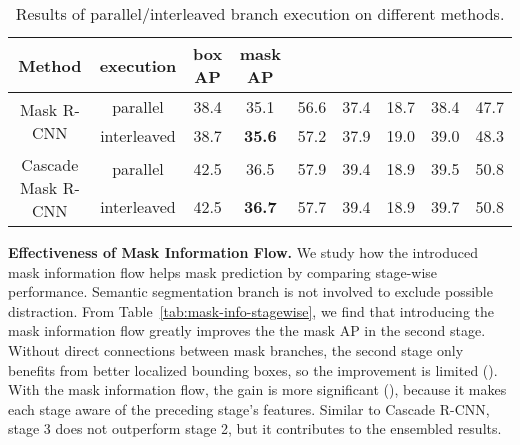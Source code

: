 \documentclass[10pt,twocolumn,letterpaper]{article}
\begin{document}
\begin{table*}[htb]
	\centering
	\caption{Results of parallel/interleaved branch execution on different methods.}
	\begin{tabular}{*{9}{c}}
		\toprule
		Method                              & execution   & box AP & mask AP &  &  &  &  &  \\
		\midrule
		\multirow{2}{*}{Mask R-CNN}         & parallel    &   38.4   &  35.1  &  56.6   &       37.4       &     18.7         &    38.4         &       47.7                      \\
		                                    & interleaved &   38.7 &   \textbf{35.6}  &     57.2         &       37.9        &    19.0        &      39.0       &      48.3       \\
		\midrule
		\multirow{2}{*}{Cascade Mask R-CNN} & parallel    &  42.5  &  36.5   &       57.9       &    39.4          &     18.9        &     39.5       &     50.8    \\
		                                    & interleaved &  42.5  &  \textbf{36.7}   &       57.7       &    39.4          &      18.9      &      39.7       &       50.8      \\
		\bottomrule
	\end{tabular}
	\label{tab:interleaved}
\end{table*}

\noindent\textbf{Effectiveness of Mask Information Flow.}
We study how the introduced mask information flow helps mask prediction by
comparing stage-wise performance.
Semantic segmentation branch is not involved to exclude possible distraction.
From Table~\ref{tab:mask-info-stagewise}, we find that introducing the mask
information flow greatly improves the the mask AP in the second stage.
Without direct connections between mask branches, the second stage only benefits
from better localized bounding boxes, so the improvement is limited ().
With the mask information flow, the gain is more significant (),
because it makes each stage aware of the preceding stage's features.
Similar to Cascade R-CNN, stage 3 does not outperform stage 2, but it
contributes to the ensembled results.
\end{document}
